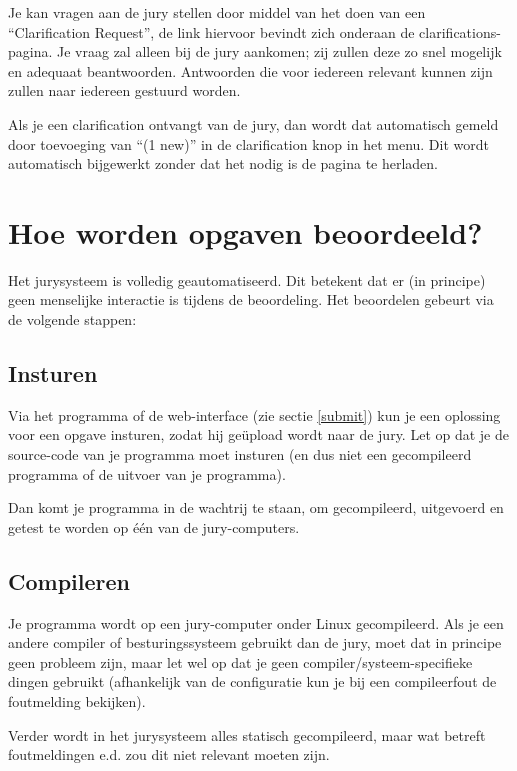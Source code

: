 Je kan vragen aan de jury stellen door middel van het doen van een
``Clarification Request'', de link hiervoor bevindt zich onderaan de
clarifications-pagina.  Je vraag zal alleen bij de jury aankomen; zij
zullen deze zo snel mogelijk en adequaat beantwoorden. Antwoorden die
voor iedereen relevant kunnen zijn zullen naar iedereen gestuurd worden.

Als je een clarification ontvangt van de jury, dan wordt dat
automatisch gemeld door toevoeging van ``(1 new)'' in de clarification
knop in het menu. Dit wordt automatisch bijgewerkt zonder dat het nodig
is de pagina te herladen.

\section{Hoe worden opgaven beoordeeld?}

Het \DOMjudge jurysysteem is volledig geautomatiseerd. Dit betekent
dat er (in principe) geen menselijke interactie is tijdens de
beoordeling. Het beoordelen gebeurt via de volgende stappen:

\subsection{Insturen}

Via het  programma of de web-interface (zie sectie
\ref{submit}) kun je een oplossing voor een opgave insturen, zodat
hij ge\"upload wordt naar de jury. Let op dat je de source-code van
je programma moet insturen (en dus niet een gecompileerd programma
of de uitvoer van je programma).

Dan komt je programma in de wachtrij te staan, om gecompileerd,
uitgevoerd en getest te worden op \'e\'en van de jury-computers.

\subsection{Compileren}

Je programma wordt op een jury-computer onder Linux gecompileerd.
Als je een andere compiler of besturingssysteem gebruikt dan de jury,
moet dat in principe geen probleem zijn, maar let wel op dat
je geen compiler/systeem-specifieke dingen gebruikt (afhankelijk van
de configuratie kun je bij een compileerfout de foutmelding bekijken).

Verder wordt in het jurysysteem alles statisch gecompileerd, maar
wat betreft foutmeldingen e.d. zou dit niet relevant moeten zijn.

